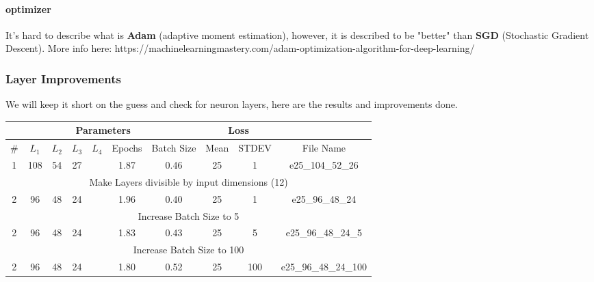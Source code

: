 \paragraph{optimizer} It's hard to describe what is \textbf{Adam} (adaptive moment estimation), however, it is described to be "better" than \textbf{SGD} (Stochastic Gradient Descent). More info here: https://machinelearningmastery.com/adam-optimization-algorithm-for-deep-learning/

\subsubsection{Layer Improvements}

We will keep it short on the guess and check for neuron layers, here are the results and improvements done.

\begin{tabular}{|c|c|c|c|c|c|c|c|c|c|} 
\hline
\multicolumn{7}{|c|}{Parameters} & \multicolumn{2}{|c|}{Loss} & {} \\
\hline
\# & $L_1$ & $L_2$ & $L_3$ & $L_4$ & Epochs & Batch Size & Mean & STDEV & File Name \\
\hline
1 & 108 & 54 & 27 & {} & 1.87 & 0.46 & 25 & 1 & e25\_104\_52\_26 \\
\hline
\multicolumn{10}{|c|}{Make Layers divisible by input dimensions (12)} \\
\hline
2 & 96 & 48 & 24 & {} & 1.96 & 0.40 & 25 & 1 & e25\_96\_48\_24 \\
\hline
\multicolumn{10}{|c|}{Increase Batch Size to 5} \\
\hline
2 & 96 & 48 & 24 & {} & 1.83 & 0.43 & 25 & 5 & e25\_96\_48\_24\_5 \\
\hline
\multicolumn{10}{|c|}{Increase Batch Size to 100} \\
\hline
2 & 96 & 48 & 24 & {} & 1.80 & 0.52 & 25 & 100 & e25\_96\_48\_24\_100 \\
\hline
\end{tabular}	




